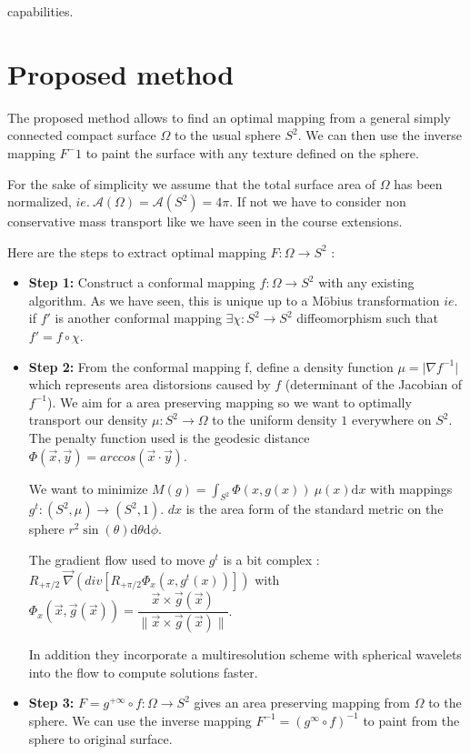 capabilities.\documentclass[11pt,a4paper]{article}
\renewcommand{\norm}[1]{\lVert #1 \rVert}
\renewcommand{\det}[1]{\lvert #1 \rvert}
\begin{document}
\section{Proposed method}

The proposed method allows to find an optimal mapping from a general simply connected compact surface $\Omega$ to the usual sphere $S^2$. We can then use the inverse mapping $F^-1$ to paint the surface with any texture defined on the sphere.

\vskip 0.3cm

For the sake of simplicity we assume that the total surface area of $\Omega$ has been normalized, $ie.\ \mathcal{A}(\Omega) = \mathcal{A}(S^2) = 4\pi$. 
If not we have to consider non conservative mass transport like we have seen in the course extensions.

\vskip 0.3cm
Here are the steps to extract optimal mapping $F : \Omega \to S^2$ :
\vskip 0.3cm

\begin{itemize}

    \item \textbf{Step 1:} Construct a conformal mapping $f : \Omega \to S^2$ with any existing algorithm. As we have seen, this is unique up to a Möbius transformation $ie. $ if $f'$ is another conformal mapping $\exists \chi : S^2 \to S^2 $ diffeomorphism such that $f' = f \circ \chi$.
    
    \item \textbf{Step 2:} From the conformal mapping f, define a density function $\mu = \det{\nabla f^{-1}}$ which represents area distorsions caused by $f$ (determinant of the Jacobian of $f^{-1}$). 
        We aim for a area preserving mapping so we want to optimally transport our density $\mu : S^2 \to \Omega$ to the uniform density $1$ everywhere on $S^2$. The penalty function used is the geodesic distance $\Phi(\vec{x},\vec{y}) = arccos(\vec{x} \cdot \vec{y})$. 

        \vskip 0.3cm
        We want to minimize $M(g) = \displaystyle \int_{S^2} \Phi(x, g(x))\ \mu(x) \mathrm{d}x$ with mappings $g^t: (S^2,\mu) \to (S^2, 1)$.
        $dx$ is the area form of the standard metric on the sphere $r^2 \sin(\theta) \mathrm{d}\theta \mathrm{d}\phi$.
        
        The gradient flow used to move $g^t$ is a bit complex : $R_{+\pi/2}\ \vec{\nabla} \left( div \left[ R_{+\pi/2}\Phi_x(x, g^t(x)) \right] \right)$
        with $\Phi_x(\vec{x}, \vec{g}(\vec{x})) = \dfrac{ \vec{x} \times \vec{g}(\vec{x}) }{\norm{\vec{x} \times \vec{g}(\vec{x})}  } $.

        In addition they incorporate a multiresolution scheme with spherical wavelets into the flow to compute solutions faster.
    
    \item \textbf{Step 3:} $F = g^{+\infty} \circ f : \Omega \to S^2$ gives an area preserving mapping from $\Omega$ to the sphere. We can use the inverse mapping $F^{-1} = \left( g^{\infty} \circ f \right)^{-1}$ to paint from the sphere to original surface. 
\end{itemize}
\end{document}
